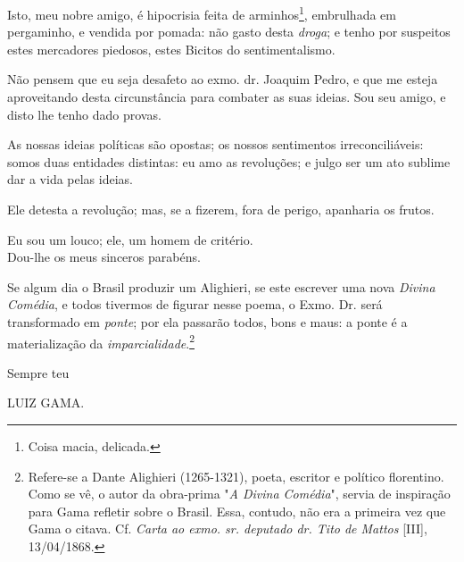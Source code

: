 Isto, meu nobre amigo, é hipocrisia feita de arminhos\footnote{Coisa
  macia, delicada.}, embrulhada em pergaminho, e vendida por pomada: não
gasto desta \emph{droga}; e tenho por suspeitos estes mercadores
piedosos, estes Bicitos do sentimentalismo.

Não pensem que eu seja desafeto ao exmo. dr. Joaquim Pedro, e que me
esteja aproveitando desta circunstância para combater as suas ideias.
Sou seu amigo, e disto lhe tenho dado provas.

As nossas ideias políticas são opostas; os nossos sentimentos
irreconciliáveis: somos duas entidades distintas: eu amo as revoluções;
e julgo ser um ato sublime dar a vida pelas ideias.

Ele detesta a revolução; mas, se a fizerem, fora de perigo, apanharia os
frutos.

Eu sou um louco; ele, um homem de critério.\\
Dou-lhe os meus sinceros parabéns.

Se algum dia o Brasil produzir um Alighieri, se este escrever uma nova
\emph{Divina Comédia}, e todos tivermos de figurar nesse poema, o Exmo.
Dr. será transformado em \emph{ponte}; por ela passarão todos, bons e
maus: a ponte é a materialização da \emph{imparcialidade}.\footnote{
  Refere-se a Dante Alighieri (1265-1321), poeta, escritor e político
  florentino. Como se vê, o autor da obra-prima "\emph{A Divina
  Comédia}", servia de inspiração para Gama refletir sobre o Brasil.
  Essa, contudo, não era a primeira vez que Gama o citava. Cf.
  \emph{Carta ao exmo. sr. deputado dr. Tito de Mattos} {[}III{]},
  13/04/1868.}

Sempre teu

LUIZ GAMA.

\pagebreak
\mbox{}\vfill
\thispagestyle{empty}

